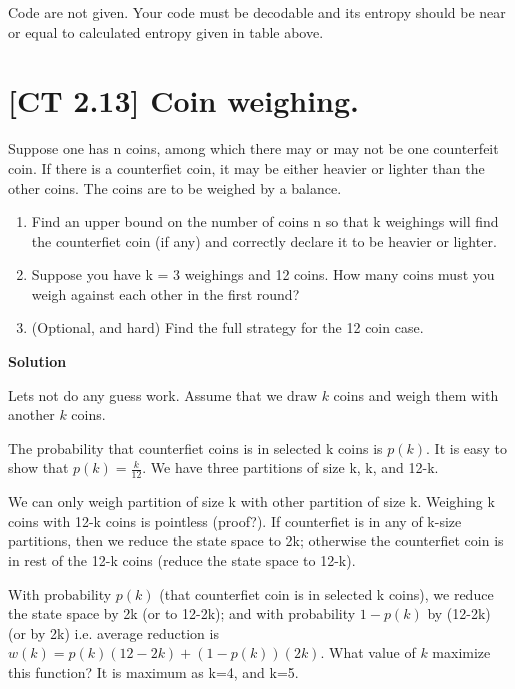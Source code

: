 \documentclass[]{article}
\providecommand{\tightlist}{%
\setlength{\itemsep}{0pt}\setlength{\parskip}{0pt}}
\begin{document}
Code are not given. Your code must be decodable and its entropy should
be near or equal to calculated entropy given in table above.

\section{{[}CT 2.13{]} Coin weighing.}\label{ct-2.13-coin-weighing.}

Suppose one has n coins, among which there may or may not be one
counterfeit coin. If there is a counterfiet coin, it may be either
heavier or lighter than the other coins. The coins are to be weighed by
a balance.

\begin{enumerate}
\def\labelenumi{\alph{enumi}.}
\tightlist
\item
  Find an upper bound on the number of coins n so that k weighings will
  find the counterfiet coin (if any) and correctly declare it to be
  heavier or lighter.
\item
  Suppose you have k = 3 weighings and 12 coins. How many coins must you
  weigh against each other in the first round?
\item
  (Optional, and hard) Find the full strategy for the 12 coin case.
\end{enumerate}

\textbf{Solution}

Lets not do any guess work. Assume that we draw \(k\) coins and weigh
them with another \(k\) coins.

The probability that counterfiet coins is in selected k coins is
\(p(k)\). It is easy to show that \(p(k) = \frac{k}{12}\). We have three
partitions of size k, k, and 12-k.

We can only weigh partition of size k with other partition of size k.
Weighing k coins with 12-k coins is pointless (proof?). If counterfiet
is in any of k-size partitions, then we reduce the state space to 2k;
otherwise the counterfiet coin is in rest of the 12-k coins (reduce the
state space to 12-k).

With probability \(p(k)\) (that counterfiet coin is in selected k
coins), we reduce the state space by 2k (or to 12-2k); and with
probability \(1-p(k)\) by (12-2k) (or by 2k) i.e. average reduction is
\(w(k)=p(k)(12-2k)+(1-p(k))(2k)\). What value of \(k\) maximize this
function? It is maximum as k=4, and k=5.

\end{document}
